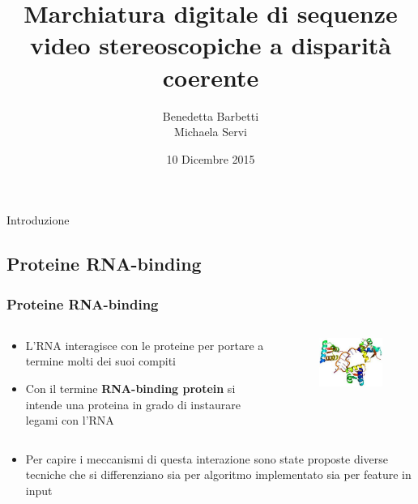 \documentclass{beamer}
\title{Marchiatura digitale di sequenze video stereoscopiche a disparità coerente}
\author{Benedetta Barbetti\\ 
		Michaela Servi}
\institute{Universit\`{a} degli studi di Firenze}
\date{10 Dicembre 2015}
\begin{document}
\begin{frame}
\titlepage
\end{frame}

\begin{section}{Introduzione}
\subsection{Proteine RNA-binding}
\begin{frame}
\frametitle{Proteine RNA-binding}
\begin{columns}[T]
\begin{column}[T]{6cm}
\begin{itemize}
\item L'RNA interagisce con le proteine per portare a termine molti dei suoi compiti
\item Con il termine \textbf{RNA-binding protein} si intende una proteina in grado di instaurare legami con l'RNA
\end{itemize}
\end{column}
\begin{column}[T]{4cm}
\begin{figure}
  \includegraphics[width=1\textwidth]{./img/rna_binding}
  
  \label{fig:rna_binding}
\end{figure}
\end{column}
\end{columns}
\begin{itemize}
\item Per capire i meccanismi di questa interazione sono state proposte diverse tecniche che si differenziano sia per algoritmo implementato sia per feature in input 
\end{itemize}
\end{frame}


\end{section}
\end{document}
